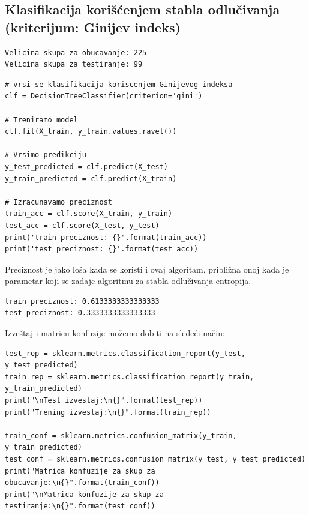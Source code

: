 \documentclass[12pt,a4paper]{article}
\begin{document}
\subsection{Klasifikacija kori\v s\' cenjem stabla odlu\v civanja (kriterijum: Ginijev indeks)}

\begin{verbatim}
Velicina skupa za obucavanje: 225
Velicina skupa za testiranje: 99
\end{verbatim}

\begin{lstlisting}
# vrsi se klasifikacija koriscenjem Ginijevog indeksa
clf = DecisionTreeClassifier(criterion='gini')

# Treniramo model
clf.fit(X_train, y_train.values.ravel())

# Vrsimo predikciju
y_test_predicted = clf.predict(X_test)
y_train_predicted = clf.predict(X_train)

# Izracunavamo preciznost
train_acc = clf.score(X_train, y_train)
test_acc = clf.score(X_test, y_test)
print('train preciznost: {}'.format(train_acc))
print('test preciznost: {}'.format(test_acc))
\end{lstlisting}

Preciznost je jako lo\v sa kada se koristi i ovaj algoritam, pribli\v zna onoj kada je parametar koji se zadaje algoritmu za stabla odlu\v civanja entropija.
\begin{verbatim}
train preciznost: 0.6133333333333333
test preciznost: 0.3333333333333333
\end{verbatim}

Izve\v staj i matricu konfuzije mo\v zemo dobiti na slede\' ci na\v cin:

\begin{lstlisting}
test_rep = sklearn.metrics.classification_report(y_test, y_test_predicted)
train_rep = sklearn.metrics.classification_report(y_train, y_train_predicted)
print("\nTest izvestaj:\n{}".format(test_rep))
print("Trening izvestaj:\n{}".format(train_rep))

train_conf = sklearn.metrics.confusion_matrix(y_train, y_train_predicted)
test_conf = sklearn.metrics.confusion_matrix(y_test, y_test_predicted)
print("Matrica konfuzije za skup za obucavanje:\n{}".format(train_conf))
print("\nMatrica konfuzije za skup za testiranje:\n{}".format(test_conf))
\end{lstlisting}
\end{document}
